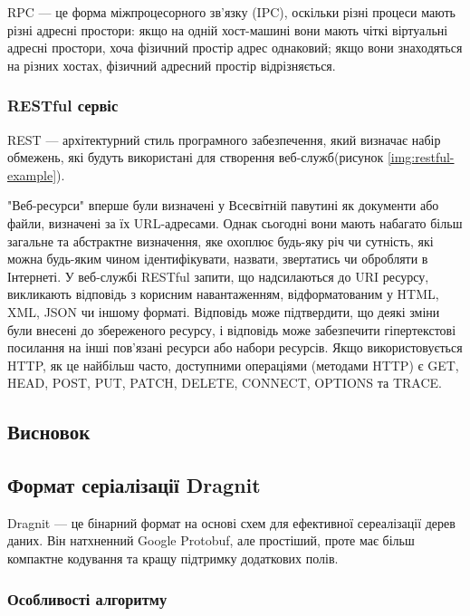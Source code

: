 \documentclass{lib/styles/default-style}
\begin{document}
    RPC --- це форма міжпроцесорного зв'язку (IPC), оскільки різні процеси
    мають різні адресні простори: якщо на одній хост-машині вони мають чіткі віртуальні
    адресні простори, хоча фізичний простір адрес однаковий; якщо вони знаходяться на різних хостах,
    фізичний адресний простір відрізняється.

    \subsubsection{RESTful сервіс}
    
    REST --- архітектурний стиль програмного забезпечення, який визначає набір обмежень,
    які будуть використані для створення веб-служб(рисунок \ref{img:restful-example}).
    

    "Веб-ресурси" вперше були визначені у Всесвітній павутині як документи або файли, визначені за їх URL-адресами.
    Однак сьогодні вони мають набагато більш загальне та абстрактне визначення, яке охоплює будь-яку річ чи сутність,
    які можна будь-яким чином ідентифікувати, назвати, звертатись чи обробляти в Інтернеті.
    У веб-службі RESTful запити, що надсилаються до URI ресурсу, викликають відповідь з корисним навантаженням,
    відформатованим у HTML, XML, JSON чи іншому форматі. Відповідь може підтвердити, що деякі зміни були внесені
    до збереженого ресурсу, і відповідь може забезпечити гіпертекстові посилання на інші пов'язані ресурси або набори ресурсів.
    Якщо використовується HTTP, як це найбільш часто, доступними операціями (методами HTTP) є GET, HEAD, POST, PUT,
    PATCH, DELETE, CONNECT, OPTIONS та TRACE.
    

    \subsection{Висновок}


\subsection{Формат серіалізації Dragnit}
    Dragnit --- це бінарний формат на основі схем для ефективної сереалізації дерев даних. Він натхненний
    Google Protobuf, але простіший, проте має більш компактне кодування та кращу підтримку додаткових полів.
    
    \subsubsection{Особливості алгоритму}
\end{document}
